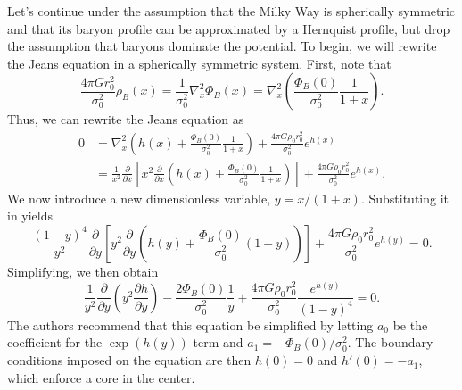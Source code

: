 Let's continue under the assumption that the Milky Way is spherically symmetric
and that its baryon profile can be approximated by a Hernquist profile, but drop
the assumption that baryons dominate the potential. To begin, we will rewrite
the Jeans equation in a spherically symmetric system. First, note that
\begin{equation}
\frac{4\pi G r_0^2}{\sigma_0^2} \rho_B(x)
= \frac{1}{\sigma_0^2} \nabla_x^2 \Phi_B(x)
= \nabla_x^2 \left( \frac{\Phi_B(0)}{\sigma_0^2} \frac{1}{1 + x} \right).
\end{equation}
Thus, we can rewrite the Jeans equation as 
\begin{align}
0
&= \nabla_x^2 \left( h(x) + \frac{\Phi_B(0)}{\sigma_0^2} \frac{1}{1 + x} \right)
    + \frac{4\pi G \rho_0 r_0^2}{\sigma_0^2} e^{h(x)} \\
&= \frac{1}{x^2} \frac{\partial}{\partial x} 
    \left[ x^2 \frac{\partial}{\partial x} 
    \left( h(x) + \frac{\Phi_B(0)}{\sigma_0^2} \frac{1}{1 + x} \right) \right]
    + \frac{4\pi G \rho_0 r_0^2}{\sigma_0^2} e^{h(x)}.
\end{align}
We now introduce a new dimensionless variable, $y = x/(1+x)$. Substituting it in
yields
\begin{equation}
\frac{(1-y)^4}{y^2} \frac{\partial}{\partial y} 
    \left[ y^2 \frac{\partial}{\partial y}
    \left( h(y) + \frac{\Phi_B(0)}{\sigma_0^2} (1 - y) \right) \right]
    + \frac{4\pi G \rho_0 r_0^2}{\sigma_0^2} e^{h(y)} = 0.
\end{equation}
Simplifying, we then obtain 
\begin{equation}
\frac{1}{y^2} \frac{\partial}{\partial y} \left( 
    y^2 \frac{\partial h}{\partial y} \right) 
    - \frac{2 \Phi_B(0)}{\sigma_0^2} \frac{1}{y}
    + \frac{4\pi G \rho_0 r_0^2}{\sigma_0^2} 
    \frac{e^{h(y)}}{(1-y)^4} = 0.
\end{equation}
The authors recommend that this equation be simplified by letting $a_0$ be the
coefficient for the $\exp(h(y))$ term and $a_1 = - \Phi_B(0) / \sigma_0^2$.
The boundary conditions imposed on the equation are then $h(0) = 0$ and $h'(0)
= -a_1$, which enforce a core in the center.

